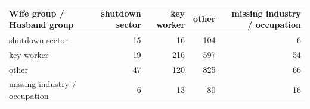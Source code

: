 
\begin{tabular}{lrrrr}
\toprule
Wife group / Husband group & shutdown sector & key worker & other & missing industry / occupation\\
\midrule
shutdown sector & 15 & 16 & 104 & 6\\
key worker & 19 & 216 & 597 & 54\\
other & 47 & 120 & 825 & 66\\
missing industry / occupation & 6 & 13 & 80 & 16\\
\bottomrule
\end{tabular}
